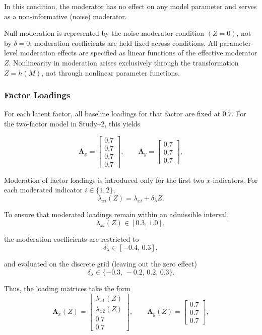 \documentclass[
  man,
  floatsintext]{apa7}
\begin{document}
In this condition, the moderator has no effect on any model parameter
and serves as a non-informative (noise) moderator.

Null moderation is represented by the noise-moderator condition
\((Z=0)\), not by \(\delta=0\); moderation coefficients are held fixed
across conditions. All parameter-level moderation effects are specified
as linear functions of the effective moderator \(Z\). Nonlinearity in
moderation arises exclusively through the transformation \(Z = h(M)\),
not through nonlinear parameter functions.

\subsubsection{Factor Loadings}\label{factor-loadings-1}

For each latent factor, all baseline loadings for that factor are fixed
at 0.7. For the two-factor model in Study\textasciitilde2, this yields

\[
\boldsymbol{\Lambda}_x =
\begin{bmatrix}
0.7\\
0.7\\
0.7\\
0.7
\end{bmatrix},
\qquad
\boldsymbol{\Lambda}_y =
\begin{bmatrix}
0.7\\
0.7\\
0.7
\end{bmatrix},
\]

Moderation of factor loadings is introduced only for the first two
\(x\)-indicators. For each moderated indicator \(i \in \{1,2\}\), \[
\lambda_{xi}(Z) = \lambda_{xi} + \delta_{\lambda} Z .
\]

To ensure that moderated loadings remain within an admissible interval,
\[
\lambda_{xi}(Z) \in [0.3,\,1.0],
\]

the moderation coefficients are restricted to \[
\delta_{\lambda} \in [-0.4,\,0.3],
\]

and evaluated on the discrete grid (leaving out the zero effect) \[
\delta_{\lambda} \in \{-0.3,\,-0.2,\,0.2,\,0.3\}.
\]

Thus, the loading matrices take the form \[
\boldsymbol{\Lambda}_x(Z)=
\begin{bmatrix}
\lambda_{x1}(Z)\\
\lambda_{x2}(Z)\\
0.7\\
0.7
\end{bmatrix},
\qquad
\boldsymbol{\Lambda}_y(Z)=
\begin{bmatrix}
0.7\\
0.7\\
0.7
\end{bmatrix},
\]
\end{document}
